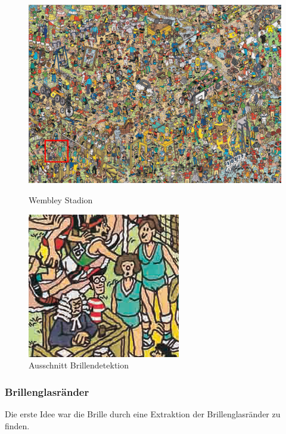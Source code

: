 \documentclass[paper=a4,fontsize=12pt]{scrartcl}
\begin{document}
\begin{figure}[htbp]
\centering
\begin{minipage}{.5\textwidth}
  \centering
  \includegraphics[height=.6\linewidth]{img/WallyWembleyGlassesSelection.png}
  \caption{Wembley Stadion}
\end{minipage}%
\begin{minipage}{.5\textwidth}
  \centering
  \includegraphics[height=.6\linewidth]{img/WallyWembleyCroppedGlasses.png}
  \caption{Ausschnitt Brillendetektion}
\end{minipage}
\end{figure}
\subsubsection*{Brillenglasränder} 
Die erste Idee war die Brille durch eine Extraktion der Brillenglasränder zu finden.
\end{document}
